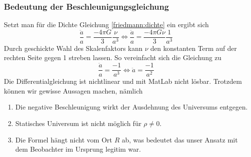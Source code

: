 \begin{refsection}
\subsubsection{Bedeutung der Beschleunigungsgleichung}
Setzt man für die Dichte Gleichung \ref{friedmann:dichte} ein ergibt sich
\[\frac{\ddot{a}}{a} = \frac{- 4 \pi G}{3} \frac{\nu}{a^3} \Leftrightarrow \frac{\ddot{a}}{a} = \frac{- 4 \pi G \nu}{3} \frac{1}{a^3}\]
Durch geschickte Wahl des Skalenfaktors kann $\nu$ den konstanten Term auf der rechten Seite gegen 1 streben lassen. So vereinfacht sich die Gleichung zu
\[\frac{\ddot{a}}{a} = \frac{-1}{a^3} \Leftrightarrow \ddot{a} = \frac{-1}{a^2}\]
Die Differentialgleichung ist nichtlinear und mit MatLab nicht lösbar. Trotzdem können wir gewisse Aussagen machen, nämlich
\begin{enumerate}
	\item Die negative Beschleunigung wirkt der Ausdehnung des Universums entgegen. 
	\item Statisches Universum ist nicht möglich für $\rho \neq 0$.
	\item Die Formel hängt nicht vom Ort $R$ ab, was bedeutet das unser Ansatz mit dem Beobachter im Ursprung legitim war.
\end{enumerate}


\end{refsection}

